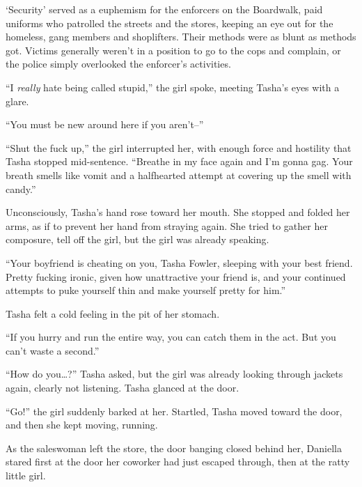 `Security' served as a euphemism for the enforcers on the Boardwalk, paid uniforms who patrolled the streets and the stores, keeping an eye out for the homeless, gang members and shoplifters.  Their methods were as blunt as methods got.  Victims generally weren't in a position to go to the cops and complain, or the police simply overlooked the enforcer's activities.



``I \emph{really} hate being called stupid,'' the girl spoke, meeting Tasha's eyes with a glare.



``You must be new around here if you aren't--''



``Shut the fuck up,'' the girl interrupted her, with enough force and hostility that Tasha stopped mid-sentence.  ``Breathe in my face again and I'm gonna gag.  Your breath smells like vomit and a halfhearted attempt at covering up the smell with candy.''



Unconsciously, Tasha's hand rose toward her mouth.  She stopped and folded her arms, as if to prevent her hand from straying again.  She tried to gather her composure, tell off the girl, but the girl was already speaking.



``Your boyfriend is cheating on you, Tasha Fowler, sleeping with your best friend.  Pretty fucking ironic, given how unattractive your friend is, and your continued attempts to puke yourself thin and make yourself pretty for him.''



Tasha felt a cold feeling in the pit of her stomach.



``If you hurry and run the entire way, you can catch them in the act.  But you can't waste a second.''



``How do you\ldots?''  Tasha asked, but the girl was already looking through jackets again, clearly not listening.  Tasha glanced at the door.



``Go!'' the girl suddenly barked at her.  Startled, Tasha moved toward the door, and then she kept moving, running.



As the saleswoman left the store, the door banging closed behind her, Daniella stared first at the door her coworker had just escaped through, then at the ratty little girl.



